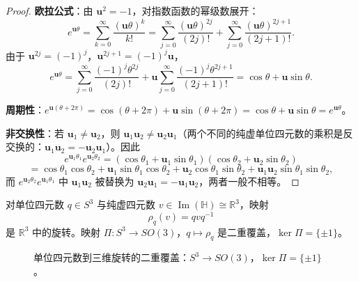 \begin{proof}
\textbf{欧拉公式}：由 $\mathbf{u}^2 = -1$，对指数函数的幂级数展开：
\[
e^{\mathbf{u}\theta} = \sum_{k=0}^{\infty} \frac{(\mathbf{u}\theta)^k}{k!} = \sum_{j=0}^{\infty} \frac{(\mathbf{u}\theta)^{2j}}{(2j)!} + \sum_{j=0}^{\infty} \frac{(\mathbf{u}\theta)^{2j+1}}{(2j+1)!}.
\]
由于 $\mathbf{u}^{2j} = (-1)^j$，$\mathbf{u}^{2j+1} = (-1)^j\mathbf{u}$，
\[
e^{\mathbf{u}\theta} = \sum_{j=0}^{\infty} \frac{(-1)^j\theta^{2j}}{(2j)!} + \mathbf{u}\sum_{j=0}^{\infty} \frac{(-1)^j\theta^{2j+1}}{(2j+1)!} = \cos\theta + \mathbf{u}\sin\theta.
\]

\textbf{周期性}：$e^{\mathbf{u}(\theta+2\pi)} = \cos(\theta+2\pi) + \mathbf{u}\sin(\theta+2\pi) = \cos\theta + \mathbf{u}\sin\theta = e^{\mathbf{u}\theta}$。

\textbf{非交换性}：若 $\mathbf{u}_1 \neq \mathbf{u}_2$，则 $\mathbf{u}_1\mathbf{u}_2 \neq \mathbf{u}_2\mathbf{u}_1$（两个不同的纯虚单位四元数的乘积是反交换的：$\mathbf{u}_1\mathbf{u}_2 = -\mathbf{u}_2\mathbf{u}_1$）。因此
\[
e^{\mathbf{u}_1\theta_1} e^{\mathbf{u}_2\theta_2} = (\cos\theta_1 + \mathbf{u}_1\sin\theta_1)(\cos\theta_2 + \mathbf{u}_2\sin\theta_2)
\]
\[
= \cos\theta_1\cos\theta_2 + \mathbf{u}_1\sin\theta_1\cos\theta_2 + \mathbf{u}_2\cos\theta_1\sin\theta_2 + \mathbf{u}_1\mathbf{u}_2\sin\theta_1\sin\theta_2,
\]
而 $e^{\mathbf{u}_2\theta_2} e^{\mathbf{u}_1\theta_1}$ 中 $\mathbf{u}_1\mathbf{u}_2$ 被替换为 $\mathbf{u}_2\mathbf{u}_1 = -\mathbf{u}_1\mathbf{u}_2$，两者一般不相等。
\end{proof}

\begin{theorem}[四元数旋转的共轭表示]\label{thm:quaternion_rotation_conjugation}
对单位四元数 $q \in S^3$ 与纯虚四元数 $v \in \operatorname{Im}(\mathbb{H}) \cong \mathbb{R}^3$，映射
\[
\rho_q(v) = q v q^{-1}
\]
是 $\mathbb{R}^3$ 中的旋转。映射 $\Pi: S^3 \to SO(3)$，$q \mapsto \rho_q$ 是二重覆盖，$\ker \Pi = \{\pm 1\}$。
\end{theorem}

\begin{figure}[htbp]
\centering
{}
\caption{单位四元数到三维旋转的二重覆盖：$S^3\to SO(3)$，$\ker\Pi=\{\pm1\}$。}
\label{fig:quaternion_cover}
\end{figure}

